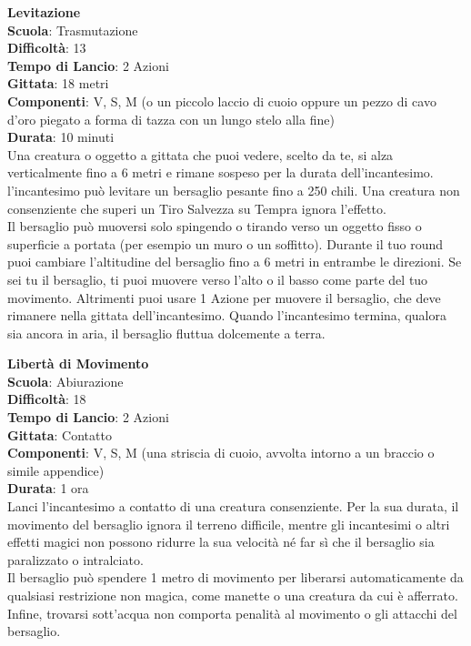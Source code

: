 \begin{multicols}{2}
\medskip\textbf{Levitazione}\\
\textbf{Scuola}: Trasmutazione\\
\textbf{Difficoltà}:  13\\
\textbf{Tempo di Lancio}: 2 Azioni\\
\textbf{Gittata}: 18 metri\\
\textbf{Componenti}: V, S, M (o un piccolo laccio di cuoio oppure un pezzo di cavo d’oro piegato a forma di tazza con un lungo stelo alla fine)\\
\textbf{Durata}: 10 minuti \\
Una creatura o oggetto a gittata che puoi vedere, scelto da te, si alza verticalmente fino a 6 metri e rimane sospeso per la durata dell'incantesimo. l'incantesimo può levitare un bersaglio pesante fino a 250 chili. Una creatura non consenziente che superi un Tiro Salvezza su Tempra ignora l’effetto.\\
Il bersaglio può muoversi solo spingendo o tirando verso un oggetto fisso o superficie a portata (per esempio un muro o un soffitto). Durante il tuo round puoi cambiare l’altitudine del bersaglio fino a 6 metri in entrambe le direzioni. Se sei tu il bersaglio, ti puoi muovere verso l’alto o il basso come parte del tuo movimento. Altrimenti puoi usare 1 Azione per muovere il bersaglio, che deve rimanere nella gittata dell'incantesimo. Quando l'incantesimo termina, qualora sia ancora in aria, il bersaglio fluttua dolcemente a terra. 

\medskip\textbf{Libertà di Movimento}\\
\textbf{Scuola}: Abiurazione\\
\textbf{Difficoltà}:  18\\
\textbf{Tempo di Lancio}: 2 Azioni\\
\textbf{Gittata}: Contatto\\
\textbf{Componenti}: V, S, M (una striscia di cuoio, avvolta intorno a un braccio o simile appendice)\\
\textbf{Durata}: 1 ora\\
Lanci l'incantesimo a contatto di una creatura consenziente. Per la sua durata, il movimento del bersaglio ignora il terreno difficile, mentre gli incantesimi o altri effetti magici non possono ridurre la sua velocità né far sì che il bersaglio sia paralizzato o intralciato.\\
Il bersaglio può spendere 1 metro di movimento per liberarsi automaticamente da qualsiasi restrizione non magica, come manette o una creatura da cui è afferrato. Infine, trovarsi sott’acqua non comporta penalità al movimento o gli attacchi del bersaglio. 


\end{multicols}
